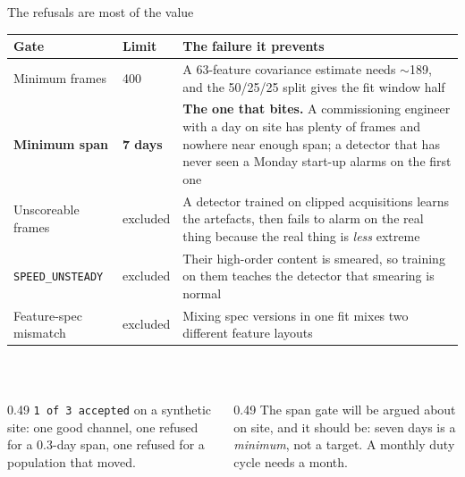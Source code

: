 \documentclass[aspectratio=169,10pt]{beamer}
\begin{document}
\begin{frame}{The refusals are most of the value}
  \centering
  \scriptsize
  \begin{tabular}{@{}llp{}@{}}
    \toprule
    \textbf{Gate} & \textbf{Limit} & \textbf{The failure it prevents} \\
    \midrule
    Minimum frames & 400 &
      A 63-feature covariance estimate needs $\sim$189, and the 50/25/25 split
      gives the fit window half \\
    \textcolor{pdmcrit}{\textbf{Minimum span}} &
      \textcolor{pdmcrit}{\textbf{7 days}} &
      \textcolor{pdmcrit}{\textbf{The one that bites.}} A commissioning engineer
      with a day on site has plenty of frames and nowhere near enough span; a
      detector that has never seen a Monday start-up alarms on the first one \\
    Unscoreable frames & excluded &
      A detector trained on clipped acquisitions learns the artefacts, then
      fails to alarm on the real thing because the real thing is \emph{less}
      extreme \\
    \texttt{SPEED\_UNSTEADY} & excluded &
      Their high-order content is smeared, so training on them teaches the
      detector that smearing is normal \\
    Feature-spec mismatch & excluded &
      Mixing spec versions in one fit mixes two different feature layouts \\
    \bottomrule
  \end{tabular}
  \\[3mm]
  \begin{columns}[T]
    \begin{column}{0.49\textwidth}
      \scriptsize
      \texttt{1 of 3 accepted} on a synthetic site: one good channel, one
      refused for a 0.3-day span, one refused for a population that moved.
    \end{column}
    \begin{column}{0.49\textwidth}
      \scriptsize\color{pdmink2}
      The span gate will be argued about on site, and it should be: seven days
      is a \emph{minimum}, not a target. A monthly duty cycle needs a month.
    \end{column}
  \end{columns}
\end{frame}
\end{document}

